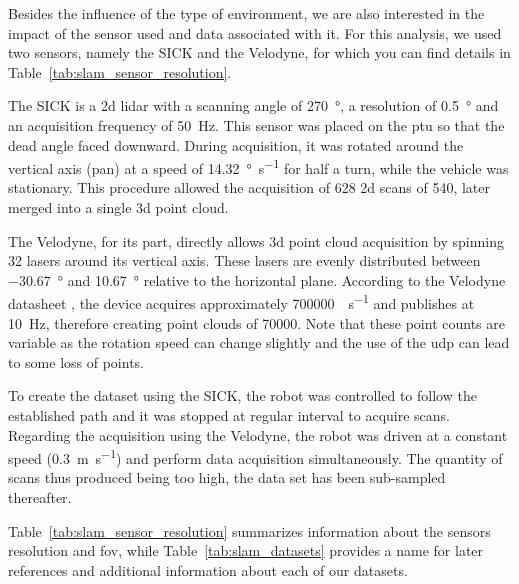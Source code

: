 Besides the influence of the type of environment, we are also interested in the impact of the sensor used and data associated with it. For this analysis, we used two sensors, namely the SICK and the Velodyne, for which you can find details in Table~\ref{tab:slam_sensor_resolution}.

The SICK is a \gls*{2d} \gls*{lidar} with a scanning angle of \SI{270}{\degree}, a resolution of \SI{0.5}{\degree} and an acquisition frequency of \SI{50}{\hertz}. This sensor was placed on the \gls*{ptu} so that the dead angle faced downward. During acquisition, it was rotated around the vertical axis (pan) at a speed of \SI{14.32}{\degree\per\second} for half a turn, while the vehicle was stationary. This procedure allowed the acquisition of 628 \gls*{2d} scans of \SI{540}{\points}, later merged into a single \gls*{3d} point cloud.

The Velodyne, for its part, directly allows \gls*{3d} point cloud acquisition by spinning 32 lasers around its vertical axis. These lasers are evenly distributed between \SI{-30.67}{\degree} and \SI{10.67}{\degree} relative to the horizontal plane. According to the Velodyne datasheet \citep{VelodyneDatasheet}, the device acquires approximately \SI{700000}{\points\per\second} and publishes at \SI{10}{\hertz}, therefore creating point clouds of \SI{70000}{\points}. Note that these point counts are variable as the rotation speed can change slightly and the use of the \gls*{udp} can lead to some loss of points.

To create the dataset using the SICK, the robot was controlled to follow the established path and it was stopped at regular interval to acquire scans. Regarding the acquisition using the Velodyne, the robot was driven at a constant speed (\SI{0.3}{\meter\per\second}) and perform data acquisition simultaneously. The quantity of scans thus produced being too high, the data set has been sub-sampled thereafter.

Table~\ref{tab:slam_sensor_resolution} summarizes information about the sensors resolution and \gls*{fov}, while Table~\ref{tab:slam_datasets} provides a name for later references and additional information about each of our datasets.

